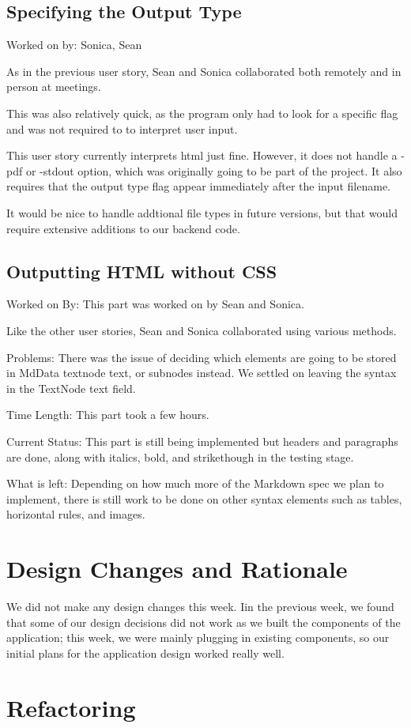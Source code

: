 \documentclass[12pt]{article}
\begin{document}
\subsection{Specifying the Output Type}

Worked on by: Sonica, Sean

As in the previous user story, Sean and Sonica collaborated both remotely and in person at meetings.

This was also relatively quick, as the program only had to look for a specific flag and was not required to to interpret user input.

This user story currently interprets html just fine. However, it does not handle a -pdf or -stdout option, which was originally going to be part of the project. It also requires that the output type flag appear immediately after the input filename.

It would be nice to handle addtional file types in future versions, but that would require extensive additions to our backend code.

\subsection{Outputting HTML without CSS}

Worked on By: This part was worked on by Sean and Sonica. 

Like the other user stories, Sean and Sonica collaborated using various methods.

Problems: There was the issue of deciding which elements are going to be stored in MdData textnode text, or subnodes instead. We settled on leaving the syntax in the TextNode text field.

Time Length: This part took a few hours. 

Current Status: This part is still being implemented but headers and paragraphs are done, along with italics, bold, and strikethough in the testing stage. 

What is left: Depending on how much more of the Markdown spec we plan to implement, there is still work to be done on other syntax elements such as tables, horizontal rules, and images. 
 \section{Design Changes and Rationale}

We did not make any design changes this week. Iin the previous week, we found that some of our design decisions did not work as we built the components of the application; this week, we were mainly plugging in existing components, so our initial plans for the application design worked really well. \section{Refactoring}
\end{document}
